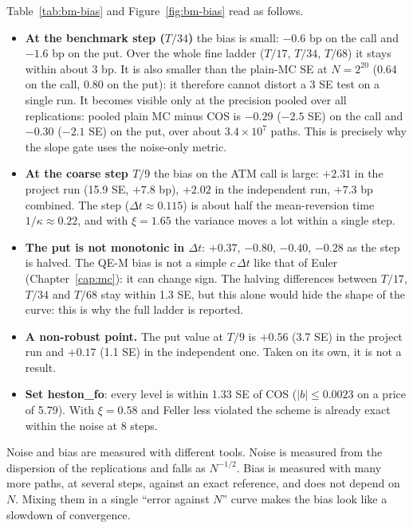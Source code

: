 Table~\ref{tab:bm-bias} and Figure~\ref{fig:bm-bias} read as follows.
\begin{itemize}
\item \textbf{At the benchmark step ($T/34$)} the bias is small: $-0.6$ bp on the call and $-1.6$ bp on the put. Over
the whole fine ladder ($T/17$, $T/34$, $T/68$) it stays within about 3 bp. It is also smaller than the plain-MC SE at
$N=2^{20}$ (0.64 on the call, 0.80 on the put): it therefore cannot distort a 3 SE test on a single run. It becomes
visible only at the precision pooled over all replications: pooled plain MC minus COS is $-0.29$ ($-2.5$ SE) on the
call and $-0.30$ ($-2.1$ SE) on the put, over about $3.4\times10^7$ paths. This is precisely why the slope gate uses
the noise-only metric.
\item \textbf{At the coarse step $T/9$} the bias on the ATM call is large: $+2.31$ in the project run (15.9 SE,
$+7.8$ bp), $+2.02$ in the independent run, $+7.3$ bp combined. The step ($\Delta t\approx0.115$) is about half the
mean-reversion time $1/\kappa\approx0.22$, and with $\xi=1.65$ the variance moves a lot within a single step.
\item \textbf{The put is not monotonic in $\Delta t$}: $+0.37$, $-0.80$, $-0.40$, $-0.28$ as the step is halved. The
QE-M bias is not a simple $c\,\Delta t$ like that of Euler (Chapter~\ref{cap:mc}): it can change sign. The halving
differences between $T/17$, $T/34$ and $T/68$ stay within 1.3 SE, but this alone would hide the shape of the curve:
this is why the full ladder is reported.
\item \textbf{A non-robust point.} The put value at $T/9$ is $+0.56$ (3.7 SE) in the project run and $+0.17$ (1.1 SE)
in the independent one. Taken on its own, it is not a result.
\item \textbf{Set heston\_fo}: every level is within 1.33 SE of COS ($|b|\le0.0023$ on a price of 5.79). With
$\xi=0.58$ and Feller less violated the scheme is already exact within the noise at 8 steps.
\end{itemize}

\begin{idea}[title={Key idea: two errors, two measurements}]
Noise and bias are measured with different tools. Noise is measured from the dispersion of the replications and falls
as $N^{-1/2}$. Bias is measured with many more paths, at several steps, against an exact reference, and does not
depend on $N$. Mixing them in a single ``error against $N$'' curve makes the bias look like a slowdown of convergence.
\end{idea}

